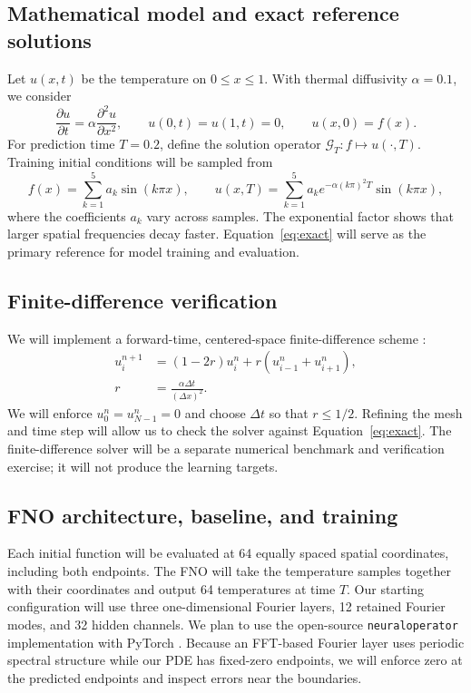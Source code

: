 \documentclass{article}
\begin{document}
\subsection{Mathematical model and exact reference solutions}
Let $u(x,t)$ be the temperature on $0\leq x\leq 1$. With thermal diffusivity $\alpha=0.1$, we consider
\begin{equation}
\frac{\partial u}{\partial t}=\alpha\frac{\partial^2u}{\partial x^2},\qquad
u(0,t)=u(1,t)=0,\qquad u(x,0)=f(x).
\label{eq:heat}
\end{equation}
For prediction time $T=0.2$, define the solution operator $\mathcal{G}_T:f\mapsto u(\cdot,T)$. Training initial conditions will be sampled from
\begin{equation}
f(x)=\sum_{k=1}^{5}a_k\sin(k\pi x),\qquad
u(x,T)=\sum_{k=1}^{5}a_k e^{-\alpha(k\pi)^2T}\sin(k\pi x),
\label{eq:exact}
\end{equation}
where the coefficients $a_k$ vary across samples. The exponential factor shows that larger spatial frequencies decay faster. Equation~\eqref{eq:exact} will serve as the primary reference for model training and evaluation.

\subsection{Finite-difference verification}
We will implement a forward-time, centered-space finite-difference scheme \citep{leveque2007finite}:
\begin{equation}
\begin{aligned}
u_i^{n+1}&=(1-2r)u_i^n+r(u_{i-1}^n+u_{i+1}^n),\\
r&=\frac{\alpha\Delta t}{(\Delta x)^2}.
\end{aligned}
\label{eq:ftcs}
\end{equation}
We will enforce $u_0^n=u_{N-1}^n=0$ and choose $\Delta t$ so that $r\leq 1/2$. Refining the mesh and time step will allow us to check the solver against Equation~\eqref{eq:exact}. The finite-difference solver will be a separate numerical benchmark and verification exercise; it will not produce the learning targets.

\subsection{FNO architecture, baseline, and training}
Each initial function will be evaluated at 64 equally spaced spatial coordinates, including both endpoints. The FNO will take the temperature samples together with their coordinates and output 64 temperatures at time $T$. Our starting configuration will use three one-dimensional Fourier layers, 12 retained Fourier modes, and 32 hidden channels. We plan to use the open-source \texttt{neuraloperator} implementation with PyTorch \citep{kossaifi2025library}. Because an FFT-based Fourier layer uses periodic spectral structure while our PDE has fixed-zero endpoints, we will enforce zero at the predicted endpoints and inspect errors near the boundaries.
\end{document}
